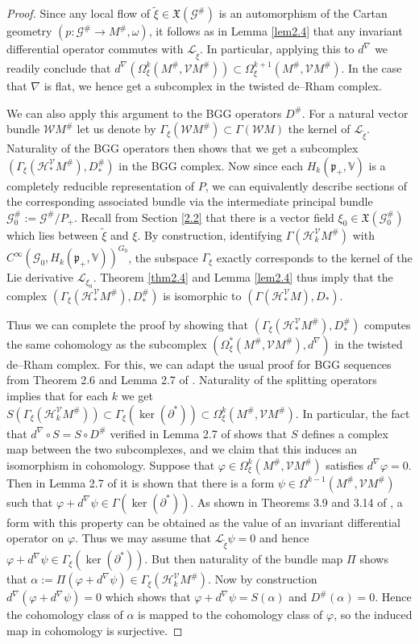 \documentclass[12pt,a4paper]{amsart}
\def\frak{\mathfrak}
\def\Bbb{\mathbb}
\def\Cal{\mathcal}
\let\phi\varphi
\renewcommand{\o}{\circ}
\newcommand{\al}{\alpha}
\newcommand{\om}{\omega}
\newcommand{\ph}{\phi}
\newcommand{\ps}{\psi}
\newcommand{\Ga}{\Gamma}
\newcommand{\Om}{\Omega}
\numberwithin{theorem}{section}
\theoremstyle{definition}
\theoremstyle{remark}
\begin{document}
\begin{proof}
Since any local flow of $\tilde\xi\in\frak X(\Cal G^\#)$ is an
automorphism of the Cartan geometry $(p:\Cal G^\#\to M^\#,\om)$, it
follows as in Lemma \ref{lem2.4} that any invariant differential operator
commutes with $\Cal L_{\tilde\xi}$. In particular, applying this to
$d^\nabla$ we readily conclude that $d^\nabla(\Om^k_\xi(M^\#,\Cal
VM^\#))\subset \Om^{k+1}_\xi(M^\#,\Cal VM^\#)$. In the case that
$\nabla$ is flat, we hence get a subcomplex in the twisted de--Rham
complex. 

We can also apply this argument to the BGG operators $D^\#$. For a
natural vector bundle $\Cal WM^\#$ let us denote by $\Ga_{\xi}(\Cal
WM^\#)\subset \Ga(\Cal WM)$ the kernel of $\Cal
L_{\tilde\xi}$. Naturality of the BGG operators then shows that we get
a subcomplex $(\Ga_\xi(\Cal H_*^{\Cal V}M^\#),D^\#_*)$ in the BGG
complex. Now since each $H_k(\frak p_+,\Bbb V)$ is a completely
reducible representation of $P$, we can equivalently describe sections
of the corresponding associated bundle via the intermediate principal
bundle $\Cal G_0^\#:=\Cal G^\#/P_+$. Recall from Section \ref{2.2}
that there is a vector field $\xi_0\in\frak X(\Cal G_0^\#)$ which lies
between $\tilde\xi$ and $\xi$. By construction, identifying $\Ga(\Cal
H_k^{\Cal V}M^\#)$ with $C^\infty (\Cal G_0,H_k(\frak p_+,\Bbb
V))^{G_0}$, the subspace $\Ga_\xi$ exactly corresponds to the kernel
of the Lie derivative $\Cal L_{\xi_0}$. Theorem \ref{thm2.4} and Lemma
\ref{lem2.4} thus imply that the complex $(\Ga_\xi(\Cal H_*^{\Cal
  V}M^\#),D^\#_*)$ is isomorphic to $(\Ga(\Cal H_*^{\Cal V}M),D_*)$.

Thus we can complete the proof by showing that $(\Ga_\xi(\Cal
H_*^{\Cal V}M^\#),D^\#_*)$ computes the same cohomology as the
subcomplex $(\Om^*_\xi(M^\#,\Cal VM^\#),d^\nabla)$ in the twisted
de--Rham complex. For this, we can adapt the usual proof for BGG
sequences from Theorem 2.6 and Lemma 2.7 of \cite{CSS-BGG}. Naturality
of the splitting operators implies that for each $k$ we get
$S(\Ga_\xi(\Cal H_k^{\Cal V}M^\#))\subset
\Ga_\xi(\ker(\partial^*))\subset \Om_\xi^k(M^\#,\Cal VM^\#)$.  In
particular, the fact that $d^\nabla\o S=S\o D^\#$ verified in Lemma
2.7 of \cite{CSS-BGG} shows that $S$ defines a complex map between the
two subcomplexes, and we claim that this induces an isomorphism in
cohomology. Suppose that $\ph\in\Om^k_\xi(M^\#,\Cal VM^\#)$ satisfies
$d^\nabla\ph=0$. Then in Lemma 2.7 of \cite{CSS-BGG} it is shown that
there is a form $\ps\in\Om^{k-1}(M^\#,\Cal VM^\#)$ such that
$\ph+d^\nabla\ps\in\Ga(\ker(\partial^*))$. As shown in Theorems 3.9
and 3.14 of \cite{Rel-BGG2}, a form with this property can be obtained
as the value of an invariant differential operator on $\ph$. Thus we may
assume that $\Cal L_{\tilde\xi}\ps=0$ and hence
$\ph+d^\nabla\ps\in\Ga_\xi(\ker(\partial^*))$. But then naturality of
the bundle map $\Pi$ shows that
$\al:=\Pi(\ph+d^\nabla\ps)\in\Ga_\xi(\Cal H_k^{\Cal V}M^\#)$. Now by
construction $d^\nabla(\ph+d^\nabla\ps)=0$ which shows that
$\ph+d^\nabla\ps=S(\al)$ and $D^\#(\al)=0$. Hence the cohomology class
of $\al$ is mapped to the cohomology class of $\ph$, so the induced
map in cohomology is surjective.


\end{proof}
\end{document}
